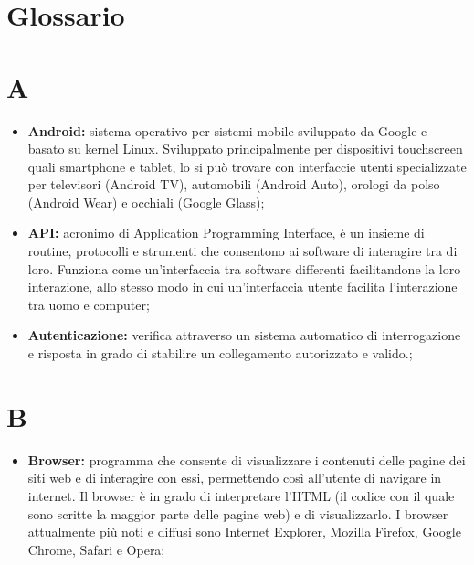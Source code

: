 %

\section{Glossario} %
\label{sec:glossario}

	\section*{\Huge A} %
		\begin{itemize}
			\item \textbf{Android:} sistema operativo per sistemi mobile sviluppato da Google e basato su kernel Linux. Sviluppato principalmente per dispositivi touchscreen quali smartphone e tablet, lo si può trovare con interfaccie utenti specializzate per televisori (Android TV), automobili (Android Auto), orologi da polso (Android Wear) e occhiali (Google Glass);
			\item \textbf{API:} acronimo di Application Programming Interface, è un insieme di routine, protocolli e strumenti che consentono ai software di interagire tra di loro. Funziona come un'interfaccia tra software differenti facilitandone la loro interazione, allo stesso modo in cui un'interfaccia utente facilita l'interazione tra uomo e computer;
			\item \textbf{Autenticazione:} verifica attraverso un sistema automatico di interrogazione e risposta in grado di stabilire un collegamento autorizzato e valido.;
		\end{itemize}

	\section*{\Huge B} %
		\begin{itemize}
			\item \textbf{Browser:} programma che consente di visualizzare i contenuti delle pagine dei siti web e di interagire con essi, permettendo così all’utente di navigare in internet. Il browser è in grado di interpretare l’HTML (il codice con il quale sono scritte la maggior parte delle pagine web) e di visualizzarlo. I browser attualmente più noti e diffusi sono Internet Explorer, Mozilla Firefox, Google Chrome, Safari e Opera;
		\end{itemize}

